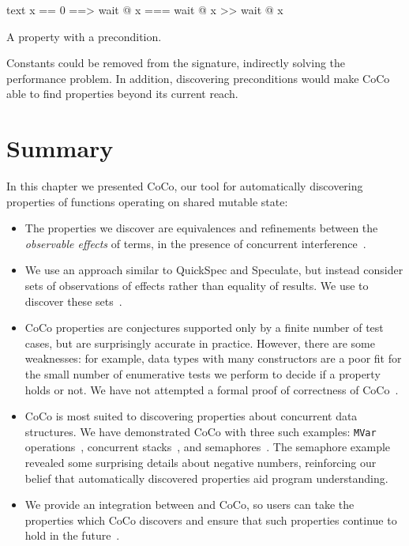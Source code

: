 \begin{listing}
\centering
\begin{cminted}{text}
x == 0  ==>  wait @ x  ===  wait @ x >> wait @ x
\end{cminted}
\caption{A property with a precondition.}\label{lst:precondition}
\end{listing}

Constants could be removed from the signature, indirectly solving the
performance problem.  In addition, discovering preconditions would
make CoCo able to find properties beyond its current
reach\cite{braquehais2017}.

\section{Summary}

In this chapter we presented CoCo, our tool for automatically
discovering properties of functions operating on shared mutable state:

\begin{itemize}
\item The properties we discover are equivalences and refinements
  between the \emph{observable effects} of terms, in the presence of
  concurrent interference~.

\item We use an approach similar to QuickSpec\cite{smallbone2017} and
  Speculate\cite{braquehais2017}, but instead consider sets of
  observations of effects rather than equality of results.  We use
  \dejafu{} to discover these sets~.

\item CoCo properties are conjectures supported only by a finite
  number of test cases, but are surprisingly accurate in practice.
  However, there are some weaknesses: for example, data types with
  many constructors are a poor fit for the small number of enumerative
  tests we perform to decide if a property holds or not.  We have not
  attempted a formal proof of correctness of
  CoCo~.

\item CoCo is most suited to discovering properties about concurrent
  data structures.  We have demonstrated CoCo with three such
  examples: \verb|MVar| operations~, concurrent
  stacks~, and
  semaphores~.  The semaphore example
  revealed some surprising details about negative numbers, reinforcing
  our belief that automatically discovered properties aid program
  understanding.

\item We provide an integration between \dejafu{} and CoCo, so users
  can take the properties which CoCo discovers and ensure that such
  properties continue to hold in the future~.
\end{itemize}

